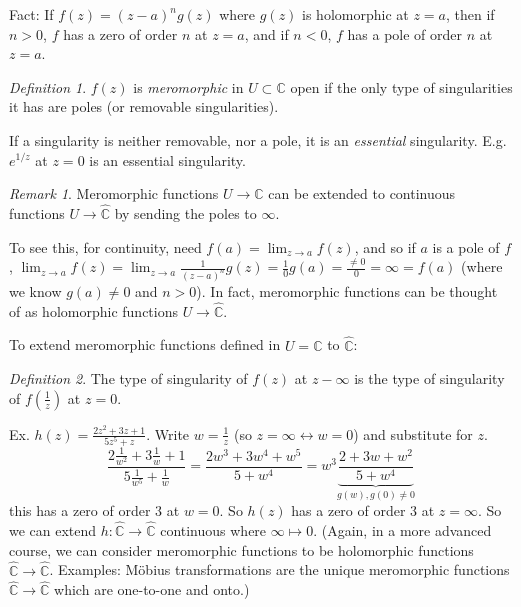 \documentclass{article}
\theoremstyle{plain}
\theoremstyle{remark}
\newtheorem{definition}{Definition}
\newtheorem{remark}{Remark}
\newcommand{\C}{{\mathbb C}}
\begin{document}
Fact: If $f(z) = (z-a)^ng(z)$ where $g(z)$ is holomorphic at $z = a$,
then if $n > 0$, $f$ has a zero of order $n$ at $z = a$,
and if $n < 0$, $f$ has a pole of order $n$ at $z = a$.

\begin{definition}
	$f(z)$ is \emph{meromorphic} in $U \subset \C$ open
	if the only type of singularities it has are poles (or removable singularities).
\end{definition}
If a singularity is neither removable, nor a pole, it is an \emph{essential} singularity.
E.g. $e^{1/z}$ at $z = 0$ is an essential singularity.

\begin{remark}
	Meromorphic functions $U \to \C$ can be extended to continuous functions
	$U \to \hat{\C}$ by sending the poles to $\infty$.
\end{remark}
To see this, for continuity, need $f(a) = \lim_{z \to a} f(z)$,
and so if $a$ is a pole of $f$,
$\lim_{z \to a} f(z) = \lim_{z \to a} \frac{1}{(z-a)^n}g(z)
= \frac{1}{0}g(a) = \frac{\neq 0}{0} = \infty = f(a)$
(where we know $g(a) \neq 0$ and $n > 0$).
In fact, meromorphic functions can be thought of as holomorphic functions $U \to \hat{\C}$.

To extend meromorphic functions defined in $U = \C$ to $\hat{\C}$:
\begin{definition}
	The type of singularity of $f(z)$ at $z - \infty$ is the
	type of singularity of $f(\frac{1}{z})$ at $z = 0$.
\end{definition}
Ex. $h(z) = \frac{2z^2 + 3z + 1}{5z^5 + z}$.
Write $w = \frac{1}{z}$ (so $z = \infty \leftrightarrow w= 0$)
and substitute for $z$.
\[
	\frac{2\frac{1}{w^2} + 3\frac{1}{w} + 1}{5\frac{1}{w^5} + \frac{1}{w}}
	= \frac{2w^3 + 3w^4 + w^5}{5 + w^4} = w^3 \underbrace{\frac{2 + 3w + w^2}
	{5 + w^4}}_{g(w), g(0)\neq0}
\]
this has a zero of order $3$ at $w = 0$.
So $h(z)$ has a zero of order $3$ at $z = \infty$.
So we can extend $h \colon \hat{\C} \to \hat{\C}$ continuous where $\infty \mapsto 0$.
(Again, in a more advanced course,
we can consider meromorphic functions to be holomorphic functions $\hat{\C} \to \hat{\C}$.
Examples: M\"{o}bius transformations are the unique meromorphic functions
$\hat{\C} \to \hat{\C}$ which are one-to-one and onto.)
\end{document}
